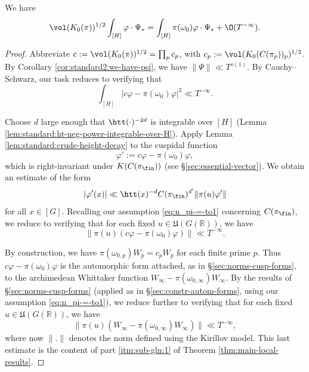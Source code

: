 \begin{lemma}\label{lem:standard:we-have-begin}
  We have
  \begin{equation}\label{eq:volk_0pi-int_h-varph}
    \vol(K_0(\pi))^{1/2}
    \int_{[H]} \varphi \cdot \Psi_{\ast}
    =
    \int_{[H]} \pi(\omega_0) \varphi \cdot \Psi_{\ast}
    + \O(T^{-\infty}).
  \end{equation}
\end{lemma}
\begin{proof}
  Abbreviate $c := \vol(K_0(\pi))^{1/2} = \prod_p c_p$, with $c_p := \vol(K_0(C(\pi_p))_p)^{1/2}$.  By Corollary \ref{cor:standard2:we-have-psi}, we have $\|\Psi\| \ll T^{o(1)}$.  By Cauchy--Schwarz, our task reduces to verifying that
  \begin{equation*}
    \int_{[H]} | c \varphi - \pi(\omega_0) \varphi |^2 \ll T^{-\infty}.
  \end{equation*}

  Choose $d$ large enough that $\htt(\cdot)^{-2d}$ is integrable over $[H]$ (Lemma \ref{lem:standard:ht-neg-power-integrable-over-H}).  Apply Lemma \ref{lem:standard:crude-height-decay} to the cuspidal function
  \begin{equation*}
    \varphi' := c \varphi - \pi(\omega_0) \varphi,
  \end{equation*}
  which is right-invariant under $K(C(\pi_{\fin}))$ (see \S\ref{sec:essential-vector}).  We obtain an estimate of the form
  \begin{equation*}
    |\varphi'(x)| \ll \htt(x)^{-d} C(\pi_{\fin})^{d'} \|\pi(u)\varphi'\|
  \end{equation*}
  for all $x \in [G]$.  Recalling our assumption \eqref{eq:n_pi-=-to1} concerning $C(\pi_{\fin})$, we reduce to verifying that for each fixed $u \in \mathfrak{U}(G(\mathbb{R}))$, we have
  \begin{equation}\label{eq:c-varphi-piomega_0}
    \|\pi(u) (c \varphi - \pi(\omega_0) \varphi) \| \ll T^{-\infty}.
  \end{equation}


  By construction, we have $\pi(\omega_{0,p}) W_p = c_p W_p$ for each finite prime $p$.  Thus $c \varphi - \pi(\omega_0) \varphi$ is the automorphic form attached, as in \S\ref{sec:norms-cusp-forms}, to the archimedean Whittaker function $W_\infty - \pi(\omega_{0,\infty}) W_\infty$.  By the results of \S\ref{sec:norms-cusp-forms} (applied as in \S\ref{sec:constr-autom-forms}, using our assumption \eqref{eq:n_pi-=-to1}), we reduce further to verifying that for each fixed $u \in \mathfrak{U}(G(\mathbb{R}))$, we have
  \begin{equation*}
    \|\pi(u) (W_\infty - \pi(\omega_{0,\infty}) W_\infty) \| \ll T^{-\infty},
  \end{equation*}
  where now $\|.\|$ denotes the norm defined using the Kirillov model.  This last estimate is the content of part \eqref{itm:sub-gln:1} of Theorem \ref{thm:main-local-results}.
\end{proof}

